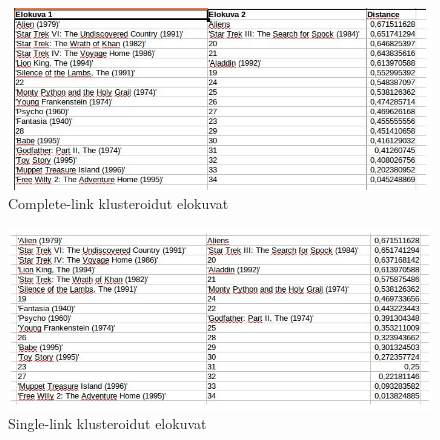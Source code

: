 \documentclass[a4paper,10pt]{article}
\begin{document}
\begin{figure}[klusterit]

\includegraphics[width=150mm]{movies.jpg}
\caption{Complete-link klusteroidut elokuvat}

\end{figure}
\begin{figure}[klusterit]

\includegraphics[width=150mm]{moviessl.jpg}
\caption{Single-link klusteroidut elokuvat}

\end{figure}
\end{document}
